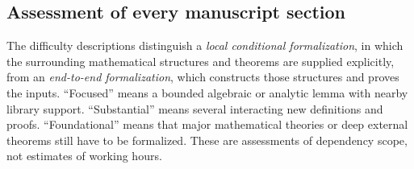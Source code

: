 \subsection{Assessment of every manuscript section}

The difficulty descriptions distinguish a \emph{local conditional
formalization}, in which the surrounding mathematical structures and
theorems are supplied explicitly, from an \emph{end-to-end
formalization}, which constructs those structures and proves the
inputs. ``Focused'' means a bounded algebraic or analytic lemma with
nearby library support. ``Substantial'' means several interacting new
definitions and proofs. ``Foundational'' means that major mathematical
theories or deep external theorems still have to be formalized. These
are assessments of dependency scope, not estimates of working hours.


